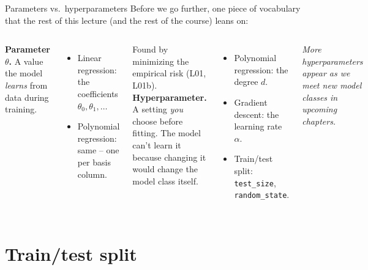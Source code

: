 \documentclass[aspectratio=169]{beamer}
\begin{document}
\begin{frame}{Parameters vs.\ hyperparameters}
  Before we go further, one piece of vocabulary that the rest of this lecture (and the rest of the course) leans on:
  \vfill
  \begin{columns}[T]
    \textbf{Parameter $\theta$.} A value the model \emph{learns} from data during training.
    \begin{itemize}\small
      \item Linear regression: the coefficients $\theta_0, \theta_1, \ldots$
      \item Polynomial regression: same -- one per basis column.
    \end{itemize}
    Found by minimizing the empirical risk (L01, L01b).
    \textbf{Hyperparameter.} A setting \emph{you} choose before fitting. The model can't learn it because changing it would change the model class itself.
    \begin{itemize}\small
      \item Polynomial regression: the degree $d$.
      \item Gradient descent: the learning rate $\alpha$.
      \item Train/test split: \texttt{test\_size}, \texttt{random\_state}.
    \end{itemize}
    \footnotesize \emph{More hyperparameters appear as we meet new model classes in upcoming chapters.}
  \end{columns}
  \vfill
\end{frame}

\section{Train/test split}
\end{document}
